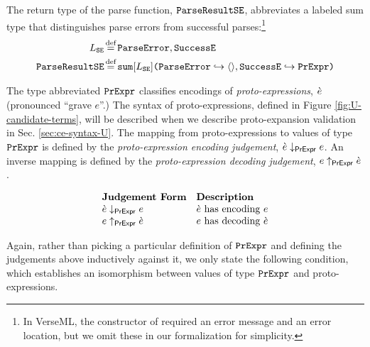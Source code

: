 \begin{enumerate}
The return type of the parse function, $\mathtt{ParseResultSE}$, abbreviates a labeled sum type that distinguishes parse errors from successful parses:\footnote{In VerseML, the  constructor of  required an error message and an error location, but we omit these in our formalization for simplicity.}
\begin{align*}
L_\mathtt{SE} & \defeq \lbltxt{ParseError}, \lbltxt{SuccessE}\\
\tParseResultExp & \defeq \asum{\labelset_\mathtt{SE}}{
  \mapitem{\lbltxt{ParseError}}{\prodt{}}, 
  \mapitem{\lbltxt{SuccessE}}{\tCEExp}
}
\end{align*} %

The type abbreviated $\mathtt{PrExpr}$ classifies encodings of \emph{proto-expressions}, $\grave{e}$ (pronounced ``grave $e$''.) The syntax of proto-expressions, defined in Figure \ref{fig:U-candidate-terms}, will be described when we describe proto-expansion validation in Sec. \ref{sec:ce-syntax-U}. The mapping from proto-expressions to values of type $\mathtt{PrExpr}$ is defined by the \emph{proto-expression encoding judgement}, $\grave{e} \downarrow_\mathsf{PrExpr} e$. An inverse mapping is defined by the \emph{proto-expression decoding judgement}, $e \uparrow_\mathsf{PrExpr} \grave{e}$.

\[\begin{array}{ll}
\textbf{Judgement Form} & \textbf{Description}\\
\grave{e} \downarrow_\mathsf{PrExpr} e & \text{$\grave{e}$ has encoding $e$}\\
e \uparrow_\mathsf{PrExpr} \grave{e} & \text{$e$ has decoding $\grave{e}$}
\end{array}\]

Again, rather than picking a particular definition of $\mathtt{PrExpr}$ and defining the judgements above inductively against it, we only state the following condition, which establishes an isomorphism between values of type $\mathtt{PrExpr}$ and proto-expressions.


\end{enumerate}
